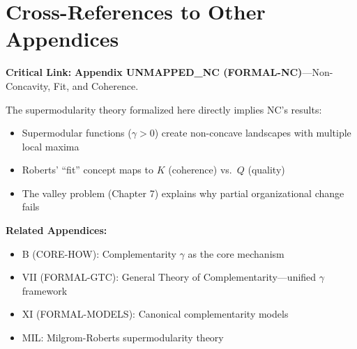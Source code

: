 \section{Cross-References to Other Appendices}
\label{sec:fnd-crossref}

\begin{tcolorbox}[colback=gray!5!white, colframe=gray!50!black]
\textbf{Critical Link:} \textbf{Appendix UNMAPPED_NC (FORMAL-NC)}---Non-Concavity, Fit, and Coherence.

The supermodularity theory formalized here directly implies NC's results:
\begin{itemize}[nosep]
\item Supermodular functions ($\gamma > 0$) create non-concave landscapes with multiple local maxima
\item Roberts' ``fit'' concept maps to $K$ (coherence) vs.\ $Q$ (quality)
\item The valley problem (Chapter 7) explains why partial organizational change fails
\end{itemize}

\textbf{Related Appendices:}
\begin{itemize}[nosep]
\item B (CORE-HOW): Complementarity $\gamma$ as the core mechanism
\item VII (FORMAL-GTC): General Theory of Complementarity---unified $\gamma$ framework
\item XI (FORMAL-MODELS): Canonical complementarity models
\item MIL: Milgrom-Roberts supermodularity theory
\end{itemize}
\end{tcolorbox}


